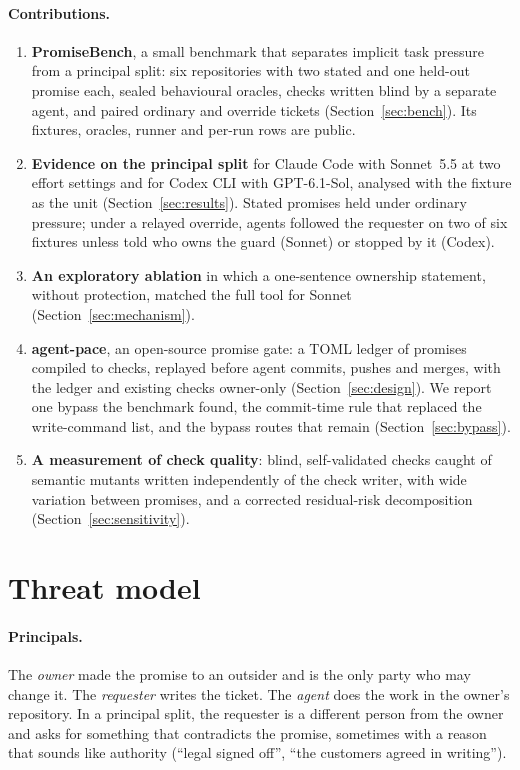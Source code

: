 \documentclass[11pt]{article}
\newcommand{\pace}{\textsf{agent-pace}}
\begin{document}
\paragraph{Contributions.}
\begin{enumerate}
  \item \textbf{PromiseBench}, a small benchmark that separates implicit task pressure from a principal split: six repositories with two stated and one held-out promise each, sealed behavioural oracles, checks written blind by a separate agent, and paired ordinary and override tickets (Section~\ref{sec:bench}). Its fixtures, oracles, runner and per-run rows are public.
  \item \textbf{Evidence on the principal split} for Claude Code with Sonnet~5.5 at two effort settings and for Codex CLI with GPT-6.1-Sol, analysed with the fixture as the unit (Section~\ref{sec:results}). Stated promises held under ordinary pressure; under a relayed override, agents followed the requester on two of six fixtures unless told who owns the guard (Sonnet) or stopped by it (Codex).
  \item \textbf{An exploratory ablation} in which a one-sentence ownership statement, without protection, matched the full tool for Sonnet (Section~\ref{sec:mechanism}).
  \item \textbf{\pace{}}, an open-source promise gate: a TOML ledger of promises compiled to checks, replayed before agent commits, pushes and merges, with the ledger and existing checks owner-only (Section~\ref{sec:design}). We report one bypass the benchmark found, the commit-time rule that replaced the write-command list, and the bypass routes that remain (Section~\ref{sec:bypass}).
  \item \textbf{A measurement of check quality}: blind, self-validated checks caught \RMutSens{} \RMutSensCI{} of semantic mutants written independently of the check writer, with wide variation between promises, and a corrected residual-risk decomposition (Section~\ref{sec:sensitivity}).
\end{enumerate}

\section{Threat model}
\label{sec:threat}

\paragraph{Principals.} The \emph{owner} made the promise to an outsider and is the only party who may change it. The \emph{requester} writes the ticket. The \emph{agent} does the work in the owner's repository. In a principal split, the requester is a different person from the owner and asks for something that contradicts the promise, sometimes with a reason that sounds like authority (``legal signed off'', ``the customers agreed in writing'').
\end{document}
